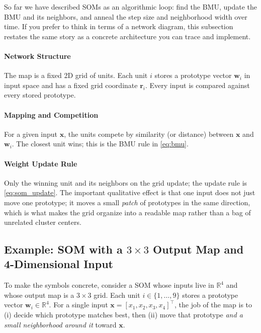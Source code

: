 So far we have described SOMs as an algorithmic loop: find the BMU, update the BMU and its neighbors, and anneal the step size and neighborhood width over time. If you prefer to think in terms of a network diagram, this subsection restates the same story as a concrete architecture you can trace and implement.

\paragraph{Network Structure}

The map is a fixed 2D grid of units. Each unit \(i\) stores a prototype vector \(\mathbf{w}_i\) in input space and has a fixed grid coordinate \(\mathbf{r}_i\). Every input is compared against every stored prototype.

\paragraph{Mapping and Competition}

For a given input \(\mathbf{x}\), the units compete by similarity (or distance) between \(\mathbf{x}\) and \(\mathbf{w}_i\). The closest unit wins; this is the BMU rule in \eqref{eq:bmu}.

\paragraph{Weight Update Rule}

Only the winning unit and its neighbors on the grid update; the update rule is \eqref{eq:som_update}. The important qualitative effect is that one input does not just move one prototype; it moves a small \emph{patch} of prototypes in the same direction, which is what makes the grid organize into a readable map rather than a bag of unrelated cluster centers.

\subsection{Example: SOM with a \texorpdfstring{\(3 \times 3\)}{3x3} Output Map and 4-Dimensional Input}
\label{sec:som_example_som_with_a_3_3_3x3_output_map_and_4_dimensional_input}

To make the symbols concrete, consider a SOM whose inputs live in \(\mathbb{R}^4\) and whose output map is a \(3\times 3\) grid. Each unit \(i\in\{1,\dots,9\}\) stores a prototype vector \(\mathbf{w}_i\in\mathbb{R}^4\). For a single input \(\mathbf{x}=[x_1,x_2,x_3,x_4]^\top\), the job of the map is to (i) decide which prototype matches best, then (ii) move that prototype \emph{and a small neighborhood around it} toward \(\mathbf{x}\).

